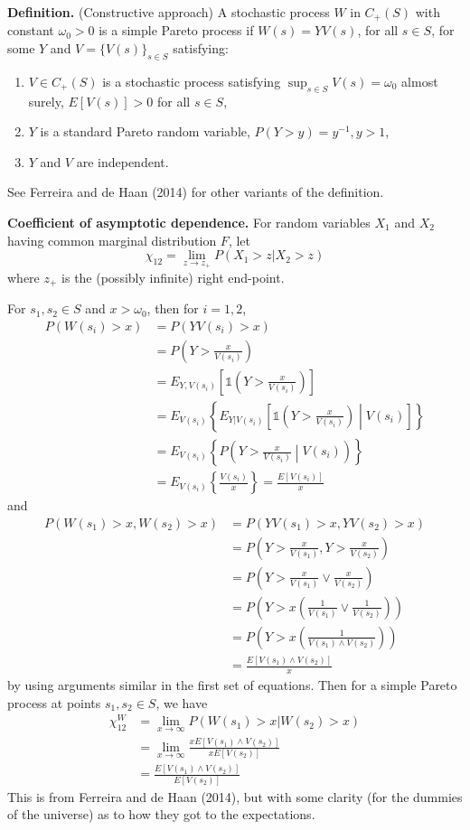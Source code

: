 \documentclass[12pt]{article}
\newcommand{\ind}{\mathds{1}}
\begin{document}
\textbf{Definition.} (Constructive approach) A stochastic process $W$ in $C_+(S)$ with constant $\omega_0>0$ is a simple Pareto process if $W(s) = Y V(s)$, for all $s\in S$, for some $Y$ and $V=\{V(s)\}_{s\in S}$ satisfying:
\begin{enumerate}[label=\alph*)]
\item $V\in C_+(S)$ is a stochastic process satisfying $\sup_{s\in S} V(s) = \omega_0$ almost surely, $E[V(s)]>0$ for all $s \in S$,
\item $Y$ is a standard Pareto random variable, $P(Y > y) = y^{-1}, y>1$,
\item $Y$ and $V$ are independent.
\end{enumerate}

See Ferreira and de Haan (2014) for other variants of the definition.
\bigskip

\textbf{Coefficient of asymptotic dependence.} For random variables $X_1$ and $X_2$ having common marginal distribution $F$, let
\[ \chi_{12} = \lim_{z\rightarrow z_+}P(X_1>z|X_2>z) \]
where $z_+$ is the (possibly infinite) right end-point.
\bigskip

For $s_1,s_2\in S$ and $x > \omega_0$, then for $i=1,2$,
\begin{align*}
P(W(s_i)>x) &= P(Y V(s_i) > x) \\
 &= P\left(Y > \frac{x}{V(s_i)}\right) \\
 &= E_{Y,V(s_i)}\left[\ind\left(Y > \frac{x}{V(s_i)}\right)\right] \\
 &= E_{V(s_i)}\left\{E_{Y|V(s_i)}\left[\ind\left(Y > \frac{x}{V(s_i)}\right) \middle| V(s_i) \right]\right\} \\
 &= E_{V(s_i)}\left\{P\left(Y > \frac{x}{V(s_i)} \middle| V(s_i) \right)\right\} \\
 &= E_{V(s_i)}\left\{\frac{V(s_i)}{x}\right\} = \frac{E[V(s_i)]}{x}
\end{align*}
and 
\begin{align*}
P(W(s_1)>x, W(s_2)>x) &= P(Y V(s_1) > x, Y V(s_2) > x) \\
 &= P\left(Y > \frac{x}{V(s_1)}, Y > \frac{x}{V(s_2)}\right) \\
 &= P\left(Y > \frac{x}{V(s_1)}\vee\frac{x}{V(s_2)}\right) \\
 &= P\left(Y > x \left(\frac{1}{V(s_1)}\vee\frac{1}{V(s_2)}\right)\right) \\
 &= P\left(Y > x \left(\frac{1}{V(s_1)\wedge V(s_2)}\right)\right) \\
 &= \frac{E[V(s_1)\wedge V(s_2)]}{x}
\end{align*}
by using arguments similar in the first set of equations. Then for a simple Pareto process at points $s_1,s_2\in S$, we have
\begin{align*}
\chi_{12}^W &= \lim_{x\rightarrow \infty} P(W(s_1) > x | W(s_2) > x) \\
 &= \lim_{x\rightarrow \infty} \frac{xE[V(s_1)\wedge V(s_2)]}{xE[V(s_2)]} \\
 &= \frac{E[V(s_1)\wedge V(s_2)]}{E[V(s_2)]}
\end{align*}
This is from Ferreira and de Haan (2014), but with some clarity (for the dummies of the universe) as to how they got to the expectations.
\end{document}
